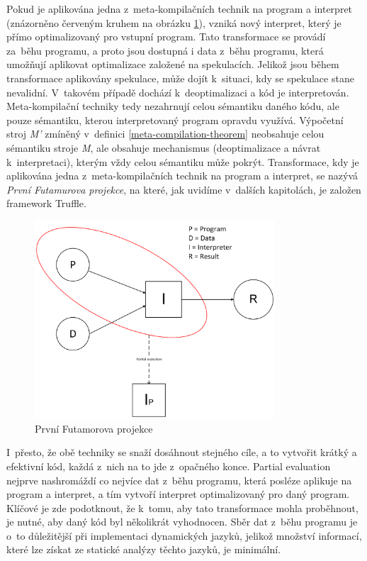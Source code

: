 \documentclass[
  master,
  biblatex,
  figures=true,
  theorems,
  sourcecodes,
  glossaries,
  index
]{kidiplom}
\begin{document}
Pokud je aplikována jedna z~meta-kompilačních technik na program a interpret (znázorněno červeným kruhem na obrázku \ref{fig:futamura-projection}), vzniká nový interpret, který je přímo optimalizovaný pro vstupní program. Tato transformace se provádí za~běhu programu, a proto jsou dostupná i data z~běhu programu, která umožňují aplikovat optimalizace založené na spekulacích. Jelikož jsou během transformace aplikovány spekulace, může dojít k~situaci, kdy se spekulace stane nevalidní. V~takovém případě dochází k~deoptimalizaci a kód je interpretován. Meta-kompilační techniky tedy nezahrnují celou sémantiku daného kódu, ale pouze sémantiku, kterou interpretovaný program opravdu využívá. Výpočetní stroj \textit{M'} zmíněný v~definici \ref{meta-compilation-theorem} neobsahuje celou sémantiku stroje \textit{M}, ale obsahuje mechanismus (deoptimalizace a návrat k~interpretaci), kterým vždy celou sémantiku může pokrýt. Transformace, kdy je aplikována jedna z~meta-kompilačních technik na program a interpret, se nazývá \textit{První Futamurova projekce}, na které, jak uvidíme v~dalších kapitolách, je založen framework Truffle. 


\begin{figure}
    \centering
    \includegraphics[width=0.8\textwidth]{images/first-futamura-projection.png}
    \caption{První Futamorova projekce}
    \label{fig:futamura-projection}
\end{figure}



I~přesto, že obě techniky se snaží dosáhnout stejného cíle, a to vytvořit krátký a efektivní kód, každá z~nich na to jde z~opačného konce. Partial evaluation nejprve nashromáždí co nejvíce dat z~běhu programu, která posléze aplikuje na program a interpret, a tím vytvoří interpret optimalizovaný pro daný program. Klíčové je zde podotknout, že k~tomu, aby tato transformace mohla proběhnout, je nutné, aby daný kód byl několikrát vyhodnocen. Sběr dat z~běhu programu je o~to důležitější při implementaci dynamických jazyků, jelikož množství informací, které lze získat ze statické analýzy těchto jazyků, je minimální. 
\end{document}
